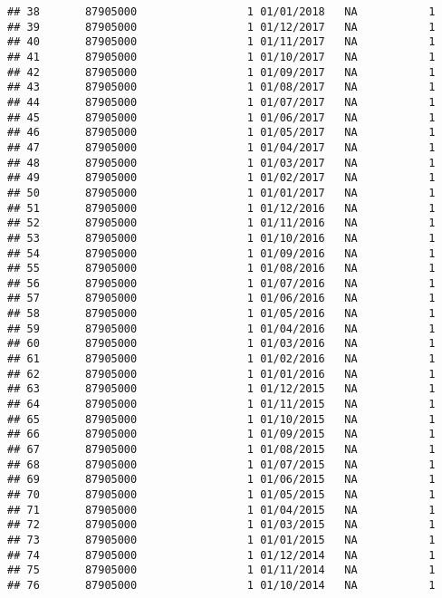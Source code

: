 \documentclass[
]{article}
\begin{document}
\begin{verbatim}
## 38       87905000                 1 01/01/2018   NA           1
## 39       87905000                 1 01/12/2017   NA           1
## 40       87905000                 1 01/11/2017   NA           1
## 41       87905000                 1 01/10/2017   NA           1
## 42       87905000                 1 01/09/2017   NA           1
## 43       87905000                 1 01/08/2017   NA           1
## 44       87905000                 1 01/07/2017   NA           1
## 45       87905000                 1 01/06/2017   NA           1
## 46       87905000                 1 01/05/2017   NA           1
## 47       87905000                 1 01/04/2017   NA           1
## 48       87905000                 1 01/03/2017   NA           1
## 49       87905000                 1 01/02/2017   NA           1
## 50       87905000                 1 01/01/2017   NA           1
## 51       87905000                 1 01/12/2016   NA           1
## 52       87905000                 1 01/11/2016   NA           1
## 53       87905000                 1 01/10/2016   NA           1
## 54       87905000                 1 01/09/2016   NA           1
## 55       87905000                 1 01/08/2016   NA           1
## 56       87905000                 1 01/07/2016   NA           1
## 57       87905000                 1 01/06/2016   NA           1
## 58       87905000                 1 01/05/2016   NA           1
## 59       87905000                 1 01/04/2016   NA           1
## 60       87905000                 1 01/03/2016   NA           1
## 61       87905000                 1 01/02/2016   NA           1
## 62       87905000                 1 01/01/2016   NA           1
## 63       87905000                 1 01/12/2015   NA           1
## 64       87905000                 1 01/11/2015   NA           1
## 65       87905000                 1 01/10/2015   NA           1
## 66       87905000                 1 01/09/2015   NA           1
## 67       87905000                 1 01/08/2015   NA           1
## 68       87905000                 1 01/07/2015   NA           1
## 69       87905000                 1 01/06/2015   NA           1
## 70       87905000                 1 01/05/2015   NA           1
## 71       87905000                 1 01/04/2015   NA           1
## 72       87905000                 1 01/03/2015   NA           1
## 73       87905000                 1 01/01/2015   NA           1
## 74       87905000                 1 01/12/2014   NA           1
## 75       87905000                 1 01/11/2014   NA           1
## 76       87905000                 1 01/10/2014   NA           1

\end{verbatim}
\end{document}
